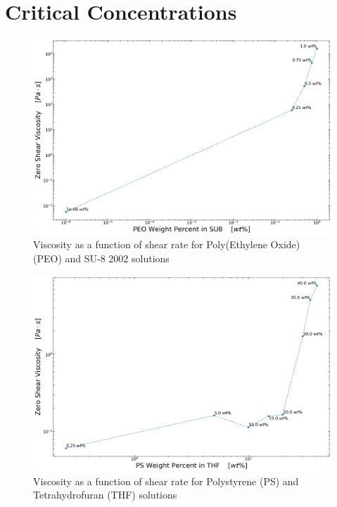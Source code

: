 
\chapter{Critical Concentrations} %

\label{Appendix_CriticalConcentrations} %

\begin{figure}[!th]
\centering
\includegraphics[width=\textwidth]{./Figures/c_vs_v_PEOinSU8.png}
\decoRule
\caption[Viscosity as a function of shear rate for Poly(Ethylene Oxide) (PEO) and SU-8 2002 solutions]{Viscosity as a function of shear rate for Poly(Ethylene Oxide) (PEO) and SU-8 2002 solutions}
\label{fig:c_vs_v_PEOinSU8}
\end{figure}

\begin{figure}[!th]
\centering
\includegraphics[width=\textwidth]{./Figures/c_vs_v_PSinTHF.png}
\decoRule
\caption[Viscosity as a function of shear rate for Polystyrene (PS) and Tetrahydrofuran (THF) solutions]{Viscosity as a function of shear rate for Polystyrene (PS) and Tetrahydrofuran (THF) solutions}
\label{fig:c_vs_v_PSinTHF}
\end{figure}

